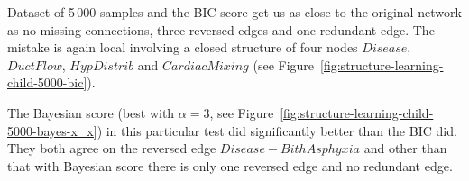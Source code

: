 \documentclass[english,cover]{fitthesis} %
\newcommand{\ignore}[1]{}                  %
\begin{document}
Dataset of 5\,000 samples and the BIC score get us as close to the original network as no missing connections, three reversed edges and one redundant edge. The mistake is again local involving a closed structure of four nodes $Disease$, $DuctFlow$, $HypDistrib$ and $CardiacMixing$ (see Figure~\ref{fig:structure-learning-child-5000-bic}). 

The Bayesian score (best with $\alpha=3$, see Figure~\ref{fig:structure-learning-child-5000-bayes-x_x}) in this particular test did significantly better than the BIC did. They both agree on the reversed edge $Disease - BithAsphyxia$ and other than that with Bayesian score there is only one reversed edge and no redundant edge.

\ignore{Bayes performance: $(\alpha=1, x, x, x)$, $(\alpha=1.5, x, x, x)$, $(\alpha=2, x, x, x)$, $(\alpha=2.5, x, x, x)$, $(\alpha=3, x, x, x)$, $(\alpha=3.5, x, x, x)$, $(\alpha=4, x, x, x)$, $(\alpha=5, x, x, x)$}
\end{document}
